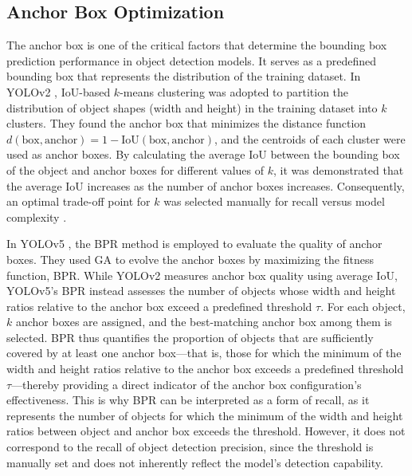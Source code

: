 \documentclass[journal,twoside,web]{ieeecolor}
\begin{document}
\subsection{Anchor Box Optimization}
The anchor box is one of the critical factors that determine the bounding box prediction performance in object detection models. It serves as a predefined bounding box that represents the distribution of the training dataset. In YOLOv2 \cite{redmon2017yolo9000}, \ac{IoU}-based $k$-means clustering was adopted to partition the distribution of object shapes (width and height) in the training dataset into $k$ clusters.
They found the anchor box that minimizes the distance function $d(\text{box}, \text{anchor}) = 1 - \text{IoU}(\text{box}, \text{anchor})$, and the centroids of each cluster were used as anchor boxes. By calculating the average \ac{IoU} between the bounding box of the object and anchor boxes for different values of $k$, it was demonstrated that the average \ac{IoU} increases as the number of anchor boxes increases. Consequently, an optimal trade-off point for $k$ was selected manually for recall versus model complexity \cite{redmon2017yolo9000}.

In YOLOv5 \cite{jocher2020ultralytics}, the \ac{BPR} method is employed to evaluate the quality of anchor boxes. They used \ac{GA} to evolve the anchor boxes by maximizing the fitness function, \ac{BPR}. While YOLOv2 measures anchor box quality using average \ac{IoU}, YOLOv5's \ac{BPR} instead assesses the number of objects whose width and height ratios relative to the anchor box exceed a predefined threshold $\tau$. For each object, $k$ anchor boxes are assigned, and the best-matching anchor box among them is selected. \ac{BPR} thus quantifies the proportion of objects that are sufficiently covered by at least one anchor box—that is, those for which the minimum of the width and height ratios relative to the anchor box exceeds a predefined threshold $\tau$—thereby providing a direct indicator of the anchor box configuration’s effectiveness. This is why \ac{BPR} can be interpreted as a form of recall, as it represents the number of objects for which the minimum of the width and height ratios between object and anchor box exceeds the threshold. However, it does not correspond to the recall of object detection precision, since the threshold is manually set and does not inherently reflect the model’s detection capability.
\end{document}
